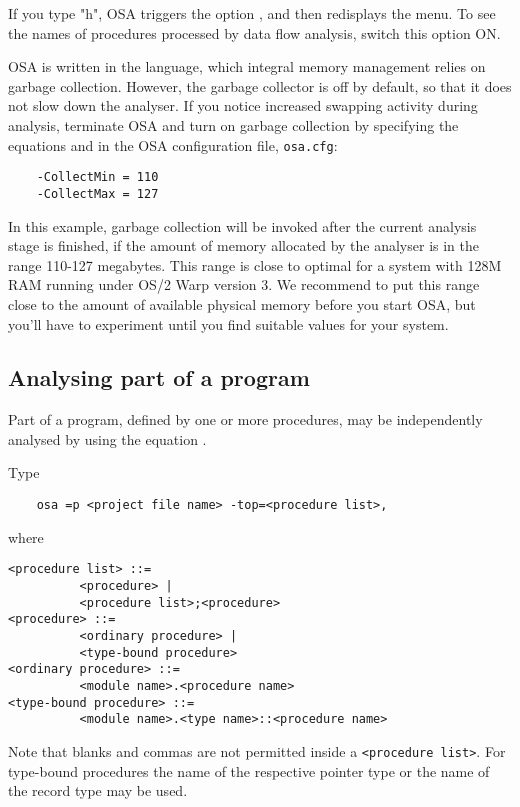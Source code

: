 If you type "h", OSA triggers the option , and then
redisplays the menu. To see the names of procedures processed by
data flow analysis, switch this option ON.

OSA is written in the \ot{} language, which integral memory management relies 
on garbage collection. However, the garbage collector is off by default,
so that it does not slow down the analyser. If you notice increased
swapping activity during analysis, terminate OSA and turn on garbage 
collection by specifying the equations  and 
 in the OSA configuration file, \verb'osa.cfg':

\verb'    -CollectMin = 110' \\
\verb'    -CollectMax = 127' 

In this example, garbage collection will be invoked after the current analysis 
stage is finished, if the amount of memory allocated by the analyser is
in the range 110-127 megabytes. This range is close to optimal for 
a system with 128M RAM running under OS/2 Warp version 3. 
We recommend to put this range close to the amount of available physical memory
before you start OSA, but you'll have to experiment until you find suitable values
for your system.


\subsection{Analysing part of a program}
\label{osa:speedup:part}

Part of a program, defined by one or more procedures, 
may be independently analysed by using the equation .

Type 

\verb'    osa =p <project file name> -top=<procedure list>, '

where 
{\samepage
\begin{verbatim}
<procedure list> ::= 
          <procedure> |
          <procedure list>;<procedure>
<procedure> ::= 
          <ordinary procedure> |
          <type-bound procedure>
<ordinary procedure> ::= 
          <module name>.<procedure name>
<type-bound procedure> ::= 
          <module name>.<type name>::<procedure name>
\end{verbatim}
} %

Note that blanks and commas are not permitted inside a \verb'<procedure list>'.
For \ot{} type-bound procedures the name of the respective pointer type 
or the name of the record type may be used.

